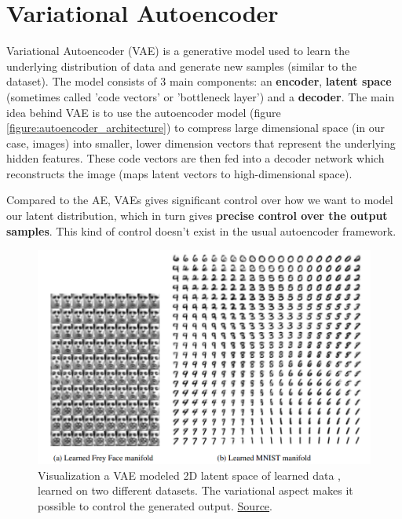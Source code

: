 \section{Variational Autoencoder}
\label{sec:vae}

Variational Autoencoder (VAE) \cite{vae} is a generative model used to learn the underlying distribution of data and generate new samples (similar to the dataset). The model consists of 3 main components: an \textbf{encoder}, \textbf{latent space} (sometimes called 'code vectors' or 'bottleneck layer') and a \textbf{decoder}. The main idea behind VAE is to use the autoencoder model \cite{autoencoder} \cite{autoencoder2} (figure \ref{figure:autoencoder_architecture}) to compress large dimensional space (in our case, images) into smaller, lower dimension vectors that represent the underlying hidden features. These code vectors are then fed into a decoder network which reconstructs the image (maps latent vectors to high-dimensional space).

Compared to the AE, VAEs gives significant control over how we want to model our latent distribution, which in turn gives \textbf{precise control over the output samples}. This kind of control doesn't exist in the usual autoencoder framework.



\begin{figure}
    \centering
    \includegraphics[scale=0.5]{images/vae.png}
    \caption{Visualization a VAE modeled 2D latent space of learned data \cite{vae}, learned on two different datasets. The variational aspect makes it possible to control the generated output. \href{https://ar5iv.labs.arxiv.org/html/1804.00140}{Source}.}
\end{figure}


